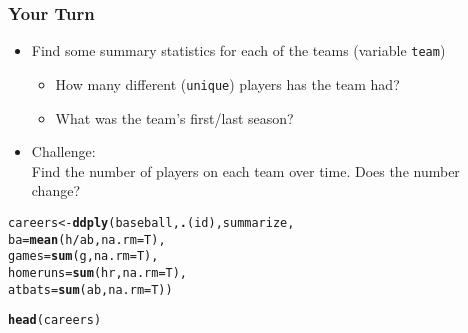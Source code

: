 \documentclass{beamer}\usepackage[]{graphicx}\usepackage[]{color}
\makeatletter
\newcommand{\hlopt}[1]{\textcolor[rgb]{0,0,0}{#1}}%
\newcommand{\hlstd}[1]{\textcolor[rgb]{0.345,0.345,0.345}{#1}}%
\newcommand{\hlkwb}[1]{\textcolor[rgb]{0.69,0.353,0.396}{#1}}%
\newcommand{\hlkwc}[1]{\textcolor[rgb]{0.333,0.667,0.333}{#1}}%
\newcommand{\hlkwd}[1]{\textcolor[rgb]{0.737,0.353,0.396}{\textbf{#1}}}%
\newenvironment{kframe}{%
 \def\at@end@of@kframe{}%
 \ifinner\ifhmode%
  \def\at@end@of@kframe{\end{minipage}}%
  \begin{minipage}{\columnwidth}%
 \fi\fi%
 \def\FrameCommand##1{\hskip\@totalleftmargin \hskip-\fboxsep
 \colorbox{shadecolor}{##1}\hskip-\fboxsep
     \hskip-\linewidth \hskip-\@totalleftmargin \hskip\columnwidth}%
 \MakeFramed {\advance\hsize-\width
   \@totalleftmargin\z@ \linewidth\hsize
   \@setminipage}}%
 {\par\unskip\endMakeFramed%
 \at@end@of@kframe}
\newenvironment{knitrout}{}{} %
\makeatother
\begin{document}
\begin{frame}[fragile]
\frametitle{Your Turn}
\begin{itemize}
\item Find some summary statistics for each of the teams (variable \texttt{team})\medskip
\begin{itemize}
\item How many different (\texttt{unique}) players has the team had?
\item What was the team's first/last season?
\end{itemize}\medskip\bigskip
\item Challenge: \\
Find the number of players on each team over time. Does the number change?
\end{itemize}

\begin{knitrout}\scriptsize
{}\color{fgcolor}\begin{kframe}
\begin{alltt}
\hlstd{careers} \hlkwb{<-} \hlkwd{ddply}\hlstd{(baseball,} \hlkwd{.}\hlstd{(id), summarize,}
                 \hlkwc{ba} \hlstd{=} \hlkwd{mean}\hlstd{(h}\hlopt{/}\hlstd{ab,} \hlkwc{na.rm}\hlstd{=T),}
                 \hlkwc{games} \hlstd{=} \hlkwd{sum}\hlstd{(g,} \hlkwc{na.rm}\hlstd{=T),}
                 \hlkwc{homeruns} \hlstd{=} \hlkwd{sum}\hlstd{(hr,} \hlkwc{na.rm}\hlstd{=T),}
                 \hlkwc{atbats} \hlstd{=} \hlkwd{sum}\hlstd{(ab,} \hlkwc{na.rm}\hlstd{=T))}

\hlkwd{head}\hlstd{(careers)}
\end{alltt}
\end{kframe}
\end{knitrout}
\end{frame}
\end{document}
